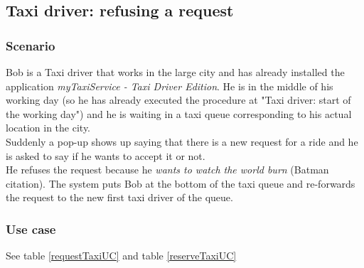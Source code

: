 \pagebreak
\subsection{Taxi driver: refusing a request}
\subsubsection{Scenario}
Bob is a Taxi driver that works in the large city and has already installed the application \textit{myTaxiService - Taxi Driver Edition}.
He is in the middle of his working day (so he has already executed the procedure at "Taxi driver: start of the working day") and he is waiting in a taxi queue corresponding to his actual location in the city.\\
Suddenly a pop-up shows up saying that there is a new request for a ride and he is asked to say if he wants to accept it or not.\\
He refuses the request because he \textit{wants to watch the world burn} (Batman citation). The system puts Bob at the bottom of the taxi queue and re-forwards the request to the new first taxi driver of the queue.

\subsubsection{Use case}
See table \ref{requestTaxiUC} and table \ref{reserveTaxiUC}